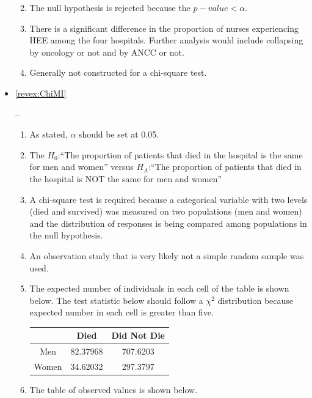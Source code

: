 \documentclass[10pt,openany]{book}\usepackage[]{graphicx}\usepackage[]{color}
\newenvironment{knitrout}{}{} %
\begin{document}
\begin{itemize}
\begin{enumerate}
\begin{knitrout}
\end{knitrout}
      \item The null hypothesis is rejected because the $p-value<\alpha$.
      \item There is a significant difference in the proportion of nurses experiencing HEE among the four hospitals.  Further analysis would include collapsing by oncology or not and by ANCC or not.
      \item Generally not constructed for a chi-square test.
    \end{enumerate}
  \item \hypertarget{ans:ChiMI}{\ref{revex:ChiMI}} --
    \begin{enumerate}
      \item As stated, $\alpha$ should be set at 0.05.
      \item The $H_{0}$:``The proportion of patients that died in the hospital is the same for men and women'' versus $H_{A}$:``The proportion of patients that died in the hospital is NOT the same for men and women''
      \item A chi-square test is required because a categorical variable with two levels (died and survived) was measured on two populations (men and women) and the distribution of responses is being compared among populations in the null hypothesis.
      \item An observation study that is very likely not a simple random sample was used.
      \item The expected number of individuals in each cell of the table is shown below.  The test statistic below should follow a $\chi^{2}$ distribution because expected number in each cell is greater than five.
        \begin{center}
          \begin{tabular}{|c|c|c|}
            \hline\hline
             & Died & Did Not Die \\
            \hline
            Men & 82.37968 & 707.6203 \\
            \hline
            Women & 34.62032 & 297.3797 \\
            \hline\hline
          \end{tabular}
        \end{center}
      \item The table of observed values is shown below.
        \begin{center}
          \begin{tabular}{|c|c|c|}
            \hline\hline

\end{tabular}
\end{center}
\end{enumerate}
\end{itemize}
\end{document}
